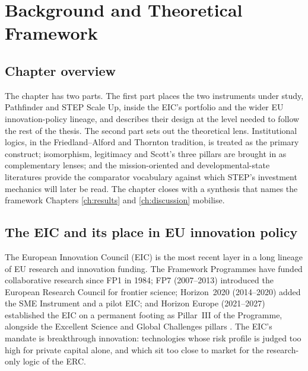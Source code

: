 %
%
\chapter{Background and Theoretical Framework}
\label{ch:background}

\section*{Chapter overview}

The chapter has two parts. The first part places the two instruments
under study, Pathfinder and STEP Scale Up, inside the EIC's portfolio
and the wider EU innovation-policy lineage, and describes their design
at the level needed to follow the rest of the thesis. The second part
sets out the theoretical lens. Institutional logics, in the
Friedland--Alford and Thornton tradition, is treated as the primary
construct; isomorphism, legitimacy and Scott's three pillars are
brought in as complementary lenses; and the mission-oriented and
developmental-state literatures provide the comparator vocabulary
against which STEP's investment mechanics will later be read. The
chapter closes with a synthesis that names the framework Chapters
\ref{ch:results} and \ref{ch:discussion} mobilise.

\section{The EIC and its place in EU innovation policy}
\label{sec:bg-eic}

The European Innovation Council (EIC) is the most recent layer in a
long lineage of EU research and innovation funding. The Framework
Programmes have funded collaborative research since FP1 in 1984; FP7
(2007--2013) introduced the European Research Council for frontier
science; Horizon~2020 (2014--2020) added the SME Instrument and a
pilot EIC; and Horizon Europe (2021--2027) established the EIC on a
permanent footing as Pillar~III of the Programme, alongside the
Excellent Science and Global Challenges pillars
\parencite{ec2025eicwp}. The EIC's mandate is breakthrough
innovation: technologies whose risk profile is judged too high for
private capital alone, and which sit too close to market for the
research-only logic of the ERC.

